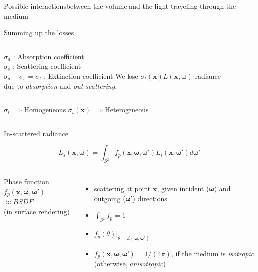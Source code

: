 \documentclass[
  english,            %
  aspectratio=169,    %
]{tumbeamer}
\newcommand\bx[0]{\bm{x}}
\newcommand\bomega[0]{\bm{\omega}}
\begin{document}
\begin{frame}{Possible interactions}{between the volume and the light
    traveling through the medium}
\begin{figure}[ht]
    \centering
    
    \label{fig:interactions}
\end{figure}
\end{frame}

\begin{frame}{Summing up the losses}
\begin{figure}[ht]
    \centering
    
    \label{fig:interactions}
\end{figure}

\begin{columns}[t, onlytextwidth]
    $\sigma_a$ : Absorption coefficient  \\
    $\sigma_s$ : Scattering coefficient \\
    $\sigma_a + \sigma_s = \sigma_t $ : Extinction coefficient
    We lose 
    $\sigma_t(\bx)L(\bx, \bomega)$
    radiance \\ due to \textit{absorption} and \textit{out-scattering}.
\end{columns}
\vfill
\begin{columns}[t, onlytextwidth]
    $\sigma_t\implies$Homogeneous  
    $\sigma_t(\bx)\implies$Heterogeneous
\end{columns}

\end{frame}

\begin{frame}{In-scattered radiance}
\begin{figure}[ht]
    \centering
    \scalebox{.6}{
        
    }
\end{figure}
$$ L_s(\bx, \bomega) = \int_{S^2} f_p(\bx, \bomega, \bomega') L_i(\bx, \bomega')
    d\bomega' $$

\begin{columns}[t, onlytextwidth]
    Phase function $f_p(\bx, \bomega, \bomega')$ \\
    \vspace{.3em}
    \scriptsize{$\approx BSDF$ \\(in surface rendering)}
    \begin{itemize}
        \item scattering at point $\bx$, given incident ($\bomega$) and outgoing
            ($\bomega'$) directions
        \item $\int_{S^2} f_p = 1$
        \item $f_p(\theta)\big|_{\theta = \measuredangle(\bomega, \bomega')}$
        \item $f_p(\bx, \bomega, \bomega') = 1/(4\pi)$, if the medium is
            \textit{isotropic}\\\hfill(otherwise, \textit{anisotropic})
    \end{itemize}
\end{columns}

\end{frame}
\end{document}

